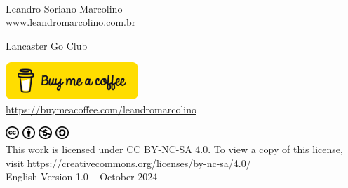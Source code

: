 \documentclass[a4paper,12pt]{extarticle}
\begin{document}
{\begin{center}


  
       \thispagestyle{empty}
\end{center}

\newpage
\thispagestyle{empty}
\
\newpage
\thispagestyle{empty}
\vspace{5cm}
\

\begin{center}
{\fontsize{100}{110}\selectfont{My First Book of\\
    Go Exercises}}

\vspace{2.5cm}

Leandro Soriano Marcolino\\
www.leandromarcolino.com.br

\vspace{3.5cm}

Lancaster Go Club

\vspace{4.5cm}

\href{https://buymeacoffee.com/leandromarcolino}{\includegraphics[width=5.0cm]{imgs/bmc-button.png}}\\
\vspace{-0.5cm}
  {\normalsize\url{https://buymeacoffee.com/leandromarcolino}}

\includegraphics[width=0.5cm]{imgs/cc-logo.pdf}
\includegraphics[width=0.5cm]{imgs/cc-by.pdf}
\includegraphics[width=0.5cm]{imgs/cc-nc.pdf}
\includegraphics[width=0.5cm]{imgs/cc-sa.pdf}\\
{\normalsize{This work is licensed under CC BY-NC-SA 4.0. To view a copy of this license, visit https://creativecommons.org/licenses/by-nc-sa/4.0/}\\
  English Version 1.0 -- October 2024}
\end{center}

}
\end{document}
